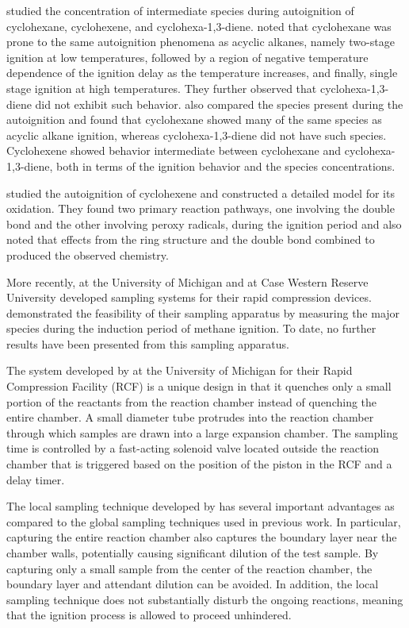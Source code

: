 \documentclass[../main.tex]{subfiles}
\begin{document}
\textcite{Lemaire2001, Ribaucour2002} studied the concentration of
intermediate species during autoignition of cyclohexane, cyclohexene,
and cyclohexa-1,3-diene. \textcite{Lemaire2001} noted that cyclohexane
was prone to the same autoignition phenomena as acyclic alkanes, namely
two-stage ignition at low temperatures, followed by a region of negative
temperature dependence of the ignition delay as the temperature increases,
and finally, single stage ignition at high temperatures. They further
observed that cyclohexa-1,3-diene did not exhibit such behavior.
\textcite{Lemaire2001} also compared the species present during the
autoignition and found that cyclohexane showed many of the same species
as acyclic alkane ignition, whereas cyclohexa-1,3-diene did not have
such species. Cyclohexene showed behavior intermediate between
cyclohexane and cyclohexa-1,3-diene, both in terms of the ignition behavior
and the species concentrations.

\textcite{Ribaucour2002} studied the autoignition of cyclohexene and
constructed a detailed model for its oxidation. They found two primary
reaction pathways, one involving the double bond and the other involving
peroxy radicals, during the ignition period and also noted that effects
from the ring structure and the double bond combined to produced the
observed chemistry.

More recently, \textcite{He2005a} at the University of Michigan and
\textcite{Mittal2006a} at Case Western Reserve University developed
sampling systems for their rapid compression devices. \textcite{Mittal2007}
demonstrated the feasibility of their sampling apparatus by measuring
the major species during the induction period of methane ignition. To date,
no further results have been presented from this sampling apparatus.

The system developed by \textcite{He2005a} at the University of Michigan
for their Rapid Compression Facility (RCF) is a unique design in that it
quenches only a small portion of the reactants from the reaction chamber
instead of quenching the entire chamber. A small diameter tube protrudes
into the reaction chamber through which samples are drawn into a large
expansion chamber. The sampling time is controlled by a fast-acting
solenoid valve located outside the reaction chamber that is triggered
based on the position of the piston in the RCF and a delay timer.

The local sampling technique developed by \textcite{He2005a} has several
important advantages as compared to the global sampling techniques used
in previous work. In particular, capturing the entire reaction chamber
also captures the boundary layer near the chamber walls, potentially
causing significant dilution of the test sample. By capturing only a
small sample from the center of the reaction chamber, the boundary layer
and attendant dilution can be avoided. In addition, the local sampling
technique does not substantially disturb the ongoing reactions,
meaning that the ignition process is allowed to proceed unhindered.
\end{document}
